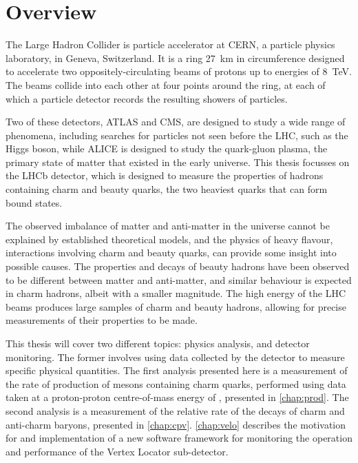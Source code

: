 \chapter{Overview}
\label{chap:intro:overview}

The Large Hadron Collider is particle accelerator at CERN, a particle physics 
laboratory, in Geneva, Switzerland.
It is a ring \SI{27}{\kilo\metre} in circumference designed to accelerate two 
oppositely-circulating beams of protons up to energies of \SI{8}{\TeV}.
The beams collide into each other at four points around the ring, at each of 
which a particle detector records the resulting showers of particles.


Two of these detectors, ATLAS and CMS, are designed to study a wide range of 
phenomena, including searches for particles not seen before the \ac{LHC}, such 
as the Higgs boson, while ALICE is designed to study the quark-gluon plasma, 
the primary state of matter that existed in the early universe.
This thesis focusses on the LHCb detector, which is designed to measure the 
properties of hadrons containing charm and beauty quarks, the two heaviest 
quarks that can form bound states.

The observed imbalance of matter and anti-matter in the universe cannot be 
explained by established theoretical models, and the physics of heavy flavour, 
interactions involving charm and beauty quarks, can provide some insight into 
possible causes.
The properties and decays of beauty hadrons have been observed to be different 
between matter and anti-matter, and similar behaviour is expected in charm 
hadrons, albeit with a smaller magnitude.
The high energy of the \ac{LHC} beams produces large samples of charm and 
beauty hadrons, allowing for precise measurements of their properties to be 
made.

This thesis will cover two different topics: physics analysis, and detector 
monitoring.
The former involves using data collected by the detector to measure specific 
physical quantities.
The first analysis presented here is a measurement of the rate of production of 
mesons containing charm quarks, performed using data taken at a proton-proton 
centre-of-mass energy of \runtwocom, presented in \cref{chap:prod}.
The second analysis is a measurement of the relative rate of the decays of 
charm and anti-charm baryons, presented in \cref{chap:cpv}.
\cref{chap:velo} describes the motivation for and implementation of a new 
software framework for monitoring the operation and performance of the Vertex 
Locator sub-detector.

